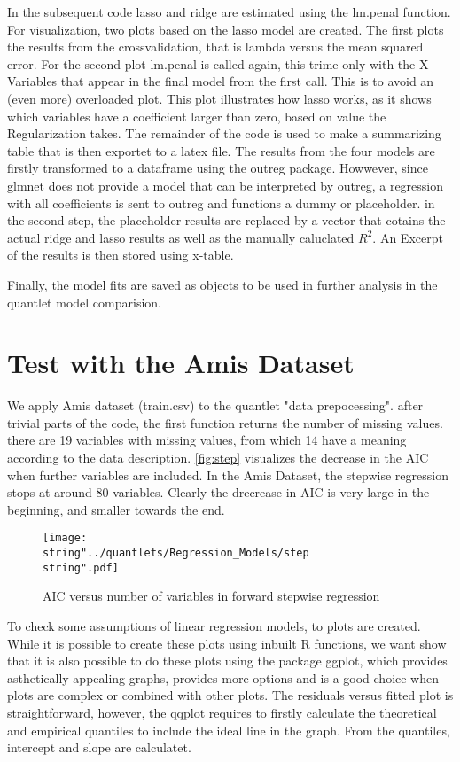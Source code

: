 In the subsequent code lasso and ridge are estimated using the lm.penal function.  For visualization, two plots based on the lasso model are created. The first plots the results from the crossvalidation, that is lambda versus the mean squared error. For the second plot lm.penal is called again, this trime only with the X-Variables  that appear in the final model from the first call. This is to avoid an (even more) overloaded plot. This plot illustrates how lasso works, as it shows which variables have a coefficient larger than zero, based on value  the Regularization takes. 
The remainder of the code is used to make a summarizing table that is then exportet to  a latex file. The results from the four models are firstly transformed to a dataframe using the outreg package. 
Howwever, since glmnet does not provide  a model that can be interpreted by outreg, a regression with all coefficients is sent to outreg and functions a dummy or placeholder. in the second step, the placeholder results are replaced by a vector that cotains the actual ridge and lasso results as well as the manually caluclated $R^{2}$.  An Excerpt of the results is then stored using x-table. 

Finally, the model fits are saved as objects to be used in further analysis in the quantlet model comparision. 


\section{Test with the Amis Dataset}
We apply Amis dataset (train.csv) to the quantlet "data prepocessing".
after trivial parts of the code, the first function returns the number of missing values.  there are 19 variables with missing values, from which 14 have a meaning according to the data description. 
\autoref{fig:step} visualizes the decrease in the AIC when further variables are included. In the Amis Dataset, the stepwise regression stops at around 80 variables. Clearly the drecrease in AIC is very large in the beginning, and smaller towards the end. 



\begin{figure}
  \centering
\texttt{[image: \\string"../quantlets/Regression\_Models/step\\string".pdf]}
  \caption{AIC versus number of variables in forward stepwise regression}\label{fig:step}
\end{figure}







To check some assumptions of linear regression models, to plots are
created. While it is possible to create these plots using inbuilt
R functions, we want show that it is also possible to do these plots
using the package ggplot, which provides asthetically appealing graphs,
provides more options and is a good choice when plots are complex
or combined with other plots. The residuals versus fitted plot is
straightforward, however, the qqplot requires to firstly calculate
the theoretical and empirical quantiles to include the ideal line
in the graph. From the quantiles, intercept and slope are calculatet. 
